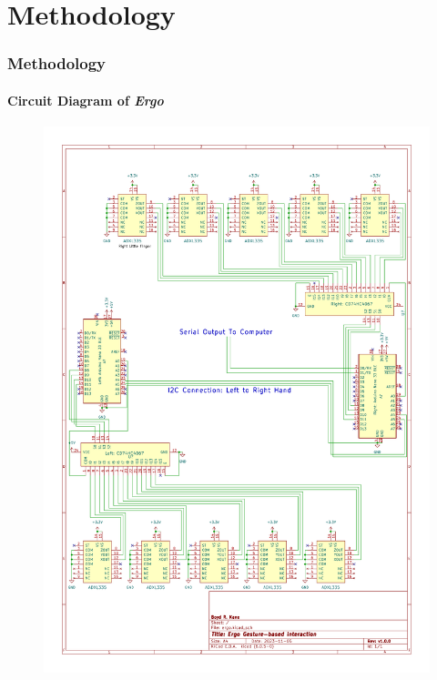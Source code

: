 \documentclass[xcolor={svgnames,table},10pt,fleqn]{beamer}
\begin{document}
\section{Methodology}
\begin{frame}
    \frametitle{Methodology}
    \framesubtitle{Circuit Diagram of \emph{Ergo}}
    \begin{figure}[h]
        \centering
        \includegraphics[height=0.8\textheight]{imgs/ergo_schematic.pdf}
    \end{figure}
\end{frame}
\end{document}
